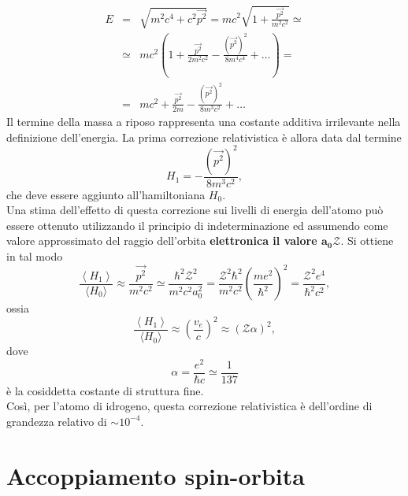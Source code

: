 \documentclass[a4paper,12pt,oneside]{book}
\begin{document}
\begin{eqnarray} 
E & = &\sqrt{m^2c^4+c^2\vec{p^2}}= mc^2 \sqrt{1+ \frac{\vec{p^2}}{m^2c^2}} \simeq \nonumber  \\
& \simeq & mc^2 \left( 1+ \frac{\vec{p^2}}{2m^2c^2}-\frac{(\vec{p^2})^2}{8m^4c^4}+\dots \right) = \nonumber  \\
& = & mc^2+\frac{\vec{p^2}}{2m}-\frac{(\vec{p^2})^2}{8m^3c^2}+ \dots 
\end{eqnarray}
Il termine della massa a riposo rappresenta una costante additiva irrilevante nella definizione dell'energia. La prima correzione relativistica è allora data dal termine 
\begin{equation} \label{eq:cap25_2}
H_1=-\frac{(\vec{p^2})^2}{8m^3c^2} ,
\end{equation}
che deve essere aggiunto all'hamiltoniana $H_0$. \\
Una stima dell'effetto di questa correzione sui livelli di energia dell'atomo può essere ottenuto utilizzando il principio di indeterminazione ed assumendo come valore approssimato del raggio dell'orbita \textbf{elettronica il valore $\boldsymbol{a_0\mathcal{Z}}$}. Si ottiene in tal modo
\begin{equation} 
\frac{\left< H_1 \right>}{\langle H_0 \rangle} \approx \frac{\vec{p^2}}{m^2c^2} \simeq \frac{\hbar^2 \mathcal{Z}^2}{m^2c^2a_0^2}=\frac{\mathcal{Z}^2 \hbar^2}{m^2c^2} \left( \frac{me^2}{\hbar^2}\right)^2=\frac{\mathcal{Z}^2 e^4}{\hbar^2 c^2} ,
\end{equation}
ossia
\begin{equation} 
\frac{\left< H_1 \right>}{\langle H_0 \rangle} \approx \left( \frac{v_e}{c} \right)^2 \approx \left(  \mathcal{Z} \alpha \right)^2 ,
\end{equation}
dove
\begin{equation} 
\alpha=\frac{e^2}{\hbar c} \simeq \frac{1}{137}
\end{equation}
è la cosiddetta costante di struttura fine. \\ Così, per l'atomo di idrogeno, questa correzione relativistica è dell'ordine di grandezza relativo di $\sim10^{-4}$.
\section{Accoppiamento spin-orbita}
\end{document}
